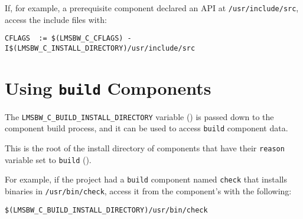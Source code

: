 If, for example, a prerequisite component declared an API at
\texttt{/usr/include/src}, access the include files with:

\begin{footnotesize}
\begin{verbatim}
CFLAGS  := $(LMSBW_C_CFLAGS) -I$(LMSBW_C_INSTALL_DIRECTORY)/usr/include/src
\end{verbatim}
\end{footnotesize}

\section{Using \texttt{build} Components}\label{wrap:using-build-components}

The \texttt{LMSBW\_C\_BUILD\_INSTALL\_DIRECTORY} variable
() is passed down to the component
build process, and it can be used to access \texttt{build} component
data.

This is the root of the install directory of components that have
their \texttt{reason} variable set to \texttt{build}
().

For example, if the project had a \texttt{build} component named
\texttt{check} that installs binaries in \texttt{/usr/bin/check},
access it from the component's \makefile with the following:

\begin{verbatim}
$(LMSBW_C_BUILD_INSTALL_DIRECTORY)/usr/bin/check
\end{verbatim}
